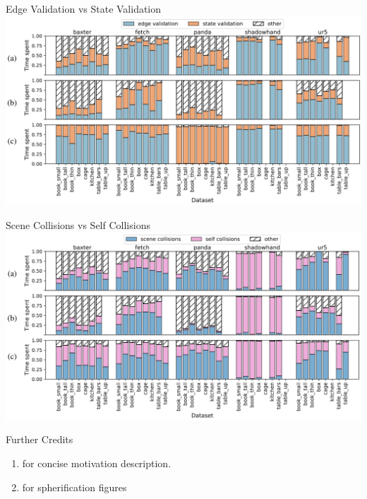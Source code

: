 \documentclass{beamer}
\newcommand{\todo}[1]{\textit{\textcolor{red}{#1}}}
\begin{document}
\begin{frame}{Edge Validation vs State Validation}
\includegraphics[width=\textwidth]{./assets/ev_sv_zoom.png}
\end{frame}

\begin{frame}{Scene Collisions vs Self Collisions}
\includegraphics[width=\textwidth]{./assets/sc_sc_zoom.png}
\end{frame}

\begin{frame}{Further Credits}
\begin{enumerate}
\item \cite{annurev:sbmp} for concise motivation description.
\item \cite{paper:cuRobo} for spherification figures
\end{enumerate}
\end{frame}

%
\end{document}
